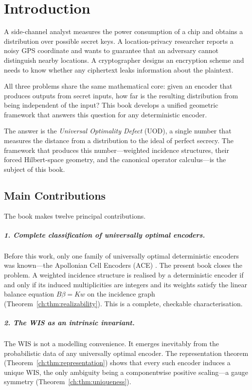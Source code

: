 \chapter[Introduction]{Introduction}\label{ch:sec:introduction}

A side-channel analyst measures the power consumption of a chip and
obtains a distribution over possible secret keys.  A location-privacy
researcher reports a noisy GPS coordinate and wants to guarantee that
an adversary cannot distinguish nearby locations.  A cryptographer
designs an encryption scheme and needs to know whether any ciphertext
leaks information about the plaintext.

All three problems share the same mathematical core: given an encoder
that produces outputs from secret inputs, how far is the resulting
distribution from being independent of the input?  This book develops
a unified geometric framework that answers this question for any
deterministic encoder.

The answer is the \emph{Universal Optimality Defect} (UOD), a single
number that measures the distance from a distribution to the ideal of
perfect secrecy.  The framework that produces this number---weighted
incidence structures, their forced Hilbert-space geometry, and the
canonical operator calculus---is the subject of this book.

\section{Main Contributions}\label{ch:sec:main-contributions}

The book makes twelve principal contributions.

\paragraph{1. Complete classification of universally optimal encoders.}
Before this work, only one family of universally optimal deterministic
encoders was known---the Apollonian Cell Encoders (ACE)
\cite{biondi2018apollonian}.  The present book closes the problem.  A
weighted incidence structure is realised by a deterministic encoder if
and only if its induced multiplicities are integers and its weights
satisfy the linear balance equation $B\beta = Kw$ on the incidence
graph (Theorem~\ref{ch:thm:realizability}).  This is a complete,
checkable characterisation.

\paragraph{2. The WIS as an intrinsic invariant.}
The WIS is not a modelling convenience.  It emerges inevitably from the
probabilistic data of any universally optimal encoder.  The
representation theorem (Theorem~\ref{ch:thm:representation}) shows that
every such encoder induces a unique WIS, the only ambiguity being a
componentwise positive scaling---a gauge symmetry (Theorem~\ref{ch:thm:uniqueness}).

